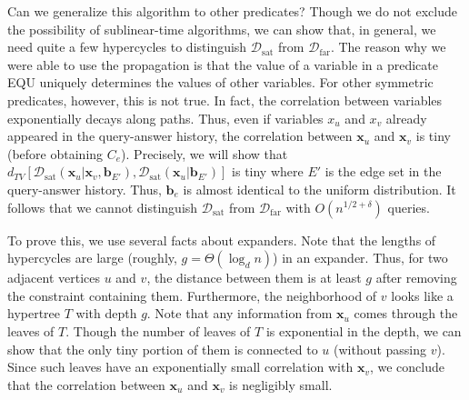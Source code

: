 \documentclass[letterpaper,11pt]{article}
\newcommand{\dtv}{d_{TV}}
\newcommand{\caldsat}{\mathcal{D}_{\mathrm{sat}}}
\newcommand{\caldfar}{\mathcal{D}_{\mathrm{far}}}
\newcommand{\bfx}{\mathbf{x}}
\newcommand{\bfb}{\mathbf{b}}
\newcommand{\equ}{\textsf{EQU}\xspace}
\begin{document}
Can we generalize this algorithm to other predicates?
Though we do not exclude the possibility of sublinear-time algorithms,
we can show that, in general, we need quite a few hypercycles to distinguish $\caldsat$ from $\caldfar$.
The reason why we were able to use the propagation is that the value of a variable in a predicate \equ uniquely determines the values of other variables.
For other symmetric predicates, however, this is not true.
In fact, the correlation between variables exponentially decays along paths.
Thus, even if variables $x_u$ and $x_v$ already appeared in the query-answer history,
the correlation between $\bfx_u$ and $\bfx_v$ is tiny (before obtaining $C_e$).
Precisely, 
we will show that $\dtv[\caldsat(\bfx_u|\bfx_v,\bfb_{E'}),\caldsat(\bfx_u|\bfb_{E'})]$ is tiny where $E'$ is the edge set in the query-answer history.
Thus, $\bfb_e$ is almost identical to the uniform distribution.
It follows that we cannot distinguish $\caldsat$ from $\caldfar$ with $O(n^{1/2+\delta})$ queries.

To prove this, we use several facts about expanders.
Note that the lengths of hypercycles are large (roughly, $g=\Theta(\log_d n)$) in an expander.
Thus, for two adjacent vertices $u$ and $v$,
the distance between them is at least $g$ after removing the constraint containing them.
Furthermore, the neighborhood of $v$ looks like a hypertree $T$ with depth $g$.
Note that any information from $\bfx_u$ comes through the leaves of $T$.
Though the number of leaves of $T$ is exponential in the depth, 
we can show that the only tiny portion of them is connected to $u$ (without passing $v$).
Since such leaves have an exponentially small correlation with $\bfx_v$,
we conclude that the correlation between $\bfx_u$ and $\bfx_v$ is negligibly small.
\end{document}
